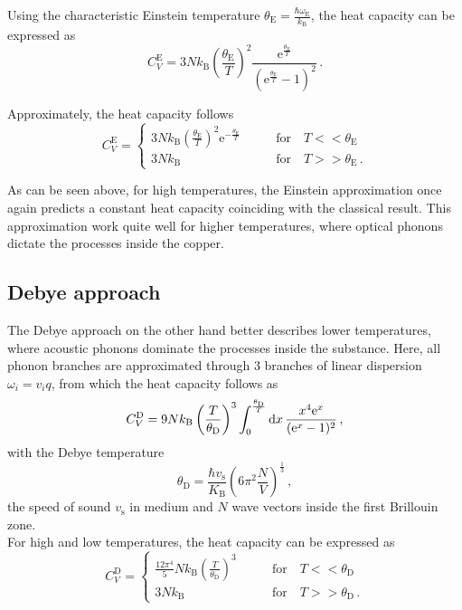 Using the characteristic Einstein temperature $\theta_\text{E} = \frac{\hbar \omega_\text{E}}{k_\text{B}}$, the heat capacity can be expressed as
\begin{equation}
    C^\text{E}_V = 3 N k_\text{B} \left(\frac{\theta_\text{E}}{T} \right)^2 \frac{\text{e}^{\frac{\theta_\text{E}}{T}}}{\left(\text{e}^{\frac{\theta_\text{E}}{T}} - 1 \right)^2} \,.
    \label{eq:einsteinheatcap}
\end{equation}

Approximately, the heat capacity follows
\begin{equation*}
    C^\text{E}_V = \begin{cases}
        3 N k_\text{B} \left(\frac{\theta_\text{E}}{T} \right)^2 \text{e}^{-\frac{\theta_\text{E}}{T}} &\qquad \text{for} \quad T << \theta_\text{E} \\ 
        3 N k_\text{B} &\qquad \text{for} \quad T >> \theta_\text{E} \,.
    \end{cases} 
\end{equation*}

As can be seen above, for high temperatures, the Einstein approximation once again predicts a constant heat capacity coinciding with the classical result.
This approximation work quite well for higher temperatures, where optical phonons dictate the processes inside the copper. \cite{}

\subsection{Debye approach}

The Debye approach on the other hand better describes lower temperatures, where acoustic phonons dominate the processes inside the substance.
Here, all phonon branches are approximated through $3$ branches of linear dispersion $\omega_i = v_i q$,  from which the heat capacity follows as
\begin{equation*}
    C^\text{D}_V = 9 N k_\text{B} \left( \frac{T}{\theta_\text{D}} \right)^3 \int^{\frac{\theta_\text{D}}{T}}_0 \mathrm{d} x \, \frac{x^4 \text{e}^x}{(\text{e}^x -1)^2} \,,
\end{equation*}
with the Debye temperature
\begin{equation*}
    \theta_\text{D} = \frac{\hbar v_\text{s}}{K_\text{B}} \left(6 \pi^2 \frac{N}{V}\right)^{\frac{1}{3}} \,,
\end{equation*}
the speed of sound $v_\text{s}$ in medium and $N$ wave vectors inside the first Brillouin zone. \\

For high and low temperatures, the heat capacity can be expressed as
\begin{equation*}
    C^\text{D}_V= \begin{cases}
        \frac{12 \pi^4}{5} N k_\text{B} \left(\frac{T} {\theta_\text{D}}\right)^3 &\qquad \text{for} \quad T << \theta_\text{D} \\ 
        3 N k_\text{B} &\qquad \text{for} \quad T >> \theta_\text{D} \,.
    \end{cases} 
\end{equation*}